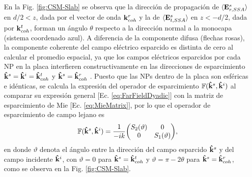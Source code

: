 En la Fig. \ref{fig:CSM-Slab} se observa que la dirección de propagación de  $\langle \vb{E}^s_{r,SSA}\rangle$ en $d/2<z$, dada por el vector de onda $\vb{k}^r_{coh}$ y la de $\langle \vb{E}^s_{t,SSA}\rangle$ en  $z<-d/2$, dada por $\vb{k}^t_{coh}$, forman un ángulo $\theta$ respecto a la dirección normal a la monocapa (sistema coordenado azul). A diferencia de la componente difusa (flechas rosas), la componente coherente del campo eléctrico esparcido es distinta de cero al calcular el promedio espacial, ya que los campos eléctricos esparcidos por cada NP en la placa interfieren constructivamente en las direcciones de esparcimiento $\vu{k}^s =\vu{k}^i=\vu{k}^t_{coh}$ y $\vu{k}^s =\vu{k}^r_{coh}$ \cite{garcia2012multiple}. Puesto que las NPs dentro de la placa son esféricas e idénticas, se calcula la expresión del operador de esparcimiento $\mathbb{F}(\vu{k}^s,\vu{k}^i)$ al comparar su expresión general [Ec. \eqref{eq:FarFieldDyadic}] con la matriz de esparcimiento de Mie [Ec. \eqref{eq:MieMatrix}], por lo que el operador de esparcimiento de campo lejano es
%
	\begin{align}
	\mathbb{F}(\vu{k}^s,\vu{k}^i) = \frac{1}{-ik} 
	 \mqty(S_2(\vartheta) & 0 \\ 0 & S_1(\vartheta)),
	 \label{eq:FFDydadic-Mie}
	\end{align}
%
en donde $\vartheta$ denota el ángulo entre la dirección del campo esparcido $\vu{k}^s$ y del campo incidente $\vu{k}^i$, con $\vartheta = 0$ para $\vu{k}^s = \vu{k}^t_{coh}$ y $\vartheta = \pi-2\theta$  para $\vu{k}^s = \vu{k}^r_{coh}$, como se observa en la Fig. \ref{fig:CSM-Slab}.
	
